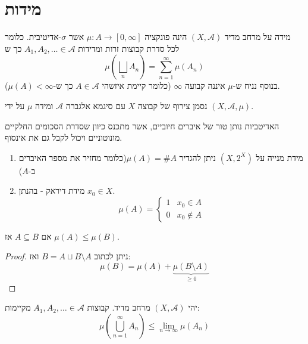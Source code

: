 \documentclass{tstextbook}
\begin{document}
\section{מידות}

\begin{definition}[מידה]
מידה על מרחב מדיד \(\left( X,\mathcal{A} \right)\) הינה פונקציה \(\mu:A\to \left[ 0,\infty \right]\) אשר \(\sigma\)-אדיטיבית. כלומר לכל סדרת קבוצות זרות ומדידות \(A_{1},A_{2},\dots \in \mathcal{A}\) כך ש
$$\mu\left( \bigsqcup_{n} A_{n} \right)=\sum_{n=1}^{\infty}\mu(A_{n})$$
בנוסף נניח ש-\(\mu\) איננה קבועה \(\infty\) (כלומר קיימת איזשהי \(A \in \mathcal{ A}\) כך ש-\(\mu(A)< \infty\)).

\end{definition}
\begin{symbolize}
נסמן צירוף של קבוצה \(X\) עם סיגמא אלגברה \(\mathcal{A}\) ומידה \(\mu\) על ידי \(\left( X,\mathcal{A},\mu \right)\).

\end{symbolize}
\begin{remark}
האדיטביות נותן טור של איברים חיוביים, אשר מתכנס כיוון שסדרת הסכומים החלקיים מונוטוניים ויכול לקבל גם את אינסוף.

\end{remark}
\begin{example}
  \begin{enumerate}
    \item מידת מנייה על \((X,2^{X})\) ניתן להגדיר \(\mu(A)=\# A\)(כלומר מחזיר את מספר האיברים ב-\(A\)) 


    \item מידת דיראק - בהנתן \(x_{0} \in X\). 
$$\mu (A)= \begin{cases} 1  & x_{0} \in A \\0  & x_{0} \not \in A
\end{cases}$$


  \end{enumerate}
\end{example}
\begin{proposition}[מונוטוניות]
אם \(A\subseteq B\) אז \(\mu(A)\leq \mu(B)\). 

\end{proposition}
\begin{proof}
ניתן לכתוב \(B=A\sqcup B\setminus  A\) ואז:
$$\mu(B)=\mu(A)+\underbrace{ \mu\left( B\setminus A \right) }_{ \geq 0 }$$

\end{proof}
\begin{proposition}[תת-אדטיביות]
יהי \(\left( X,\mathcal{A} \right)\) מרחב מדיד. קבוצות \(A_{1},A_{2},\dots \in \mathcal{A}\)  מקיימות:
$$\mu\left( \bigcup_{n=1}^{\infty}A_{n} \right)\leq \lim_{ n \to \infty } \mu(A_{n})$$

\end{proposition}
\end{document}
